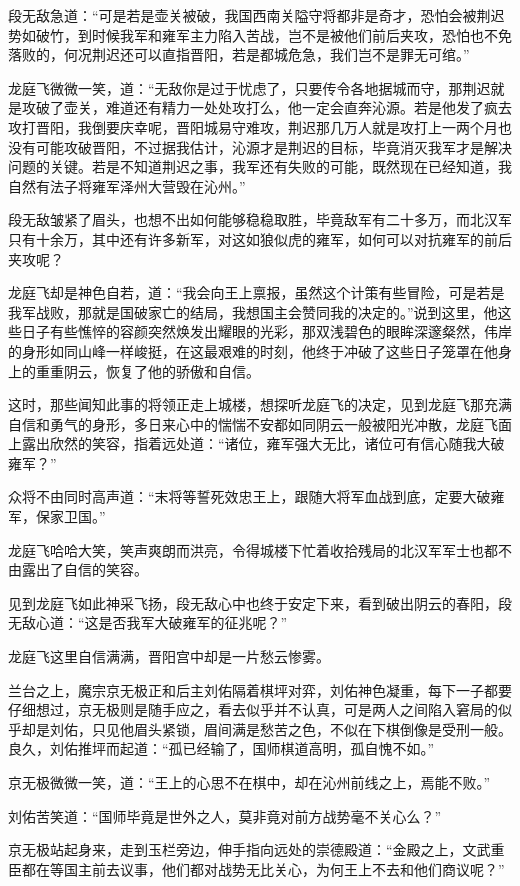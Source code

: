 段无敌急道：“可是若是壶关被破，我国西南关隘守将都非是奇才，恐怕会被荆迟势如破竹，到时候我军和雍军主力陷入苦战，岂不是被他们前后夹攻，恐怕也不免落败的，何况荆迟还可以直指晋阳，若是都城危急，我们岂不是罪无可绾。”

龙庭飞微微一笑，道：“无敌你是过于忧虑了，只要传令各地据城而守，那荆迟就是攻破了壶关，难道还有精力一处处攻打么，他一定会直奔沁源。若是他发了疯去攻打晋阳，我倒要庆幸呢，晋阳城易守难攻，荆迟那几万人就是攻打上一两个月也没有可能攻破晋阳，不过据我估计，沁源才是荆迟的目标，毕竟消灭我军才是解决问题的关键。若是不知道荆迟之事，我军还有失败的可能，既然现在已经知道，我自然有法子将雍军泽州大营毁在沁州。”

段无敌皱紧了眉头，也想不出如何能够稳稳取胜，毕竟敌军有二十多万，而北汉军只有十余万，其中还有许多新军，对这如狼似虎的雍军，如何可以对抗雍军的前后夹攻呢？

龙庭飞却是神色自若，道：“我会向王上禀报，虽然这个计策有些冒险，可是若是我军战败，那就是国破家亡的结局，我想国主会赞同我的决定的。”说到这里，他这些日子有些憔悴的容颜突然焕发出耀眼的光彩，那双浅碧色的眼眸深邃粲然，伟岸的身形如同山峰一样峻挺，在这最艰难的时刻，他终于冲破了这些日子笼罩在他身上的重重阴云，恢复了他的骄傲和自信。

这时，那些闻知此事的将领正走上城楼，想探听龙庭飞的决定，见到龙庭飞那充满自信和勇气的身形，多日来心中的惴惴不安都如同阴云一般被阳光冲散，龙庭飞面上露出欣然的笑容，指着远处道：“诸位，雍军强大无比，诸位可有信心随我大破雍军？”

众将不由同时高声道：“末将等誓死效忠王上，跟随大将军血战到底，定要大破雍军，保家卫国。”

龙庭飞哈哈大笑，笑声爽朗而洪亮，令得城楼下忙着收拾残局的北汉军军士也都不由露出了自信的笑容。

见到龙庭飞如此神采飞扬，段无敌心中也终于安定下来，看到破出阴云的春阳，段无敌心道：“这是否我军大破雍军的征兆呢？”

龙庭飞这里自信满满，晋阳宫中却是一片愁云惨雾。

兰台之上，魔宗京无极正和后主刘佑隔着棋坪对弈，刘佑神色凝重，每下一子都要仔细想过，京无极则是随手应之，看去似乎并不认真，可是两人之间陷入窘局的似乎却是刘佑，只见他眉头紧锁，眉间满是愁苦之色，不似在下棋倒像是受刑一般。良久，刘佑推坪而起道：“孤已经输了，国师棋道高明，孤自愧不如。”

京无极微微一笑，道：“王上的心思不在棋中，却在沁州前线之上，焉能不败。”

刘佑苦笑道：“国师毕竟是世外之人，莫非竟对前方战势毫不关心么？”

京无极站起身来，走到玉栏旁边，伸手指向远处的崇德殿道：“金殿之上，文武重臣都在等国主前去议事，他们都对战势无比关心，为何王上不去和他们商议呢？”

